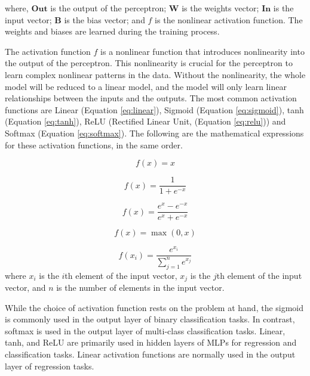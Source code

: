 where, $\textbf{Out}$ is the output of the perceptron; $\textbf{W}$ is the weights vector; $\textbf{In}$ is the input vector; $\textbf{B}$ is the bias vector; and $f$ is the nonlinear activation function. The weights and biases are learned during the training process.


The activation function $f$ is a nonlinear function that introduces nonlinearity into the output of the perceptron. This nonlinearity is crucial for the perceptron to learn complex nonlinear patterns in the data. Without the nonlinearity, the whole model will be reduced to a linear model, and the model will only learn linear relationships between the inputs and the outputs. The most common activation functions are Linear (Equation \ref{eq:linear}), Sigmoid (Equation \ref{eq:sigmoid}), \gls{tanh} (Equation \ref{eq:tanh}), ReLU (Rectified Linear Unit, (Equation \ref{eq:relu})) and Softmax (Equation \ref{eq:softmax}). The following are the mathematical expressions for these activation functions, in the same order.

\begin{equation}
 \label{eq:linear}
 f(x) = x
\end{equation}

\begin{equation}
 \label{eq:sigmoid}
 f(x) = \frac{1}{1 + e^{-x}}
\end{equation}

\begin{equation}
 \label{eq:tanh}
 f(x) = \frac{e^{x} - e^{-x}}{e^{x} + e^{-x}}
\end{equation}

\begin{equation}
 \label{eq:relu}
 f(x) = \max(0, x)
\end{equation}

\begin{equation}
 \label{eq:softmax}
 f(x_i) = \frac{e^{x_i}}{\sum_{j=1}^{n}{e^{x_j}}}
\end{equation}
 where $x_i$ is the $i$th element of the input vector, $x_j$ is the $j$th element of the input vector, and $n$ is the number of elements in the input vector.

While the choice of activation function rests on the problem at hand, the sigmoid is commonly used in the output layer of binary classification tasks. In contrast, softmax is used in the output layer of multi-class classification tasks. Linear, \gls{tanh}, and ReLU are primarily used in hidden layers of MLPs for regression and classification tasks. Linear activation functions are normally used in the output layer of regression tasks. 

